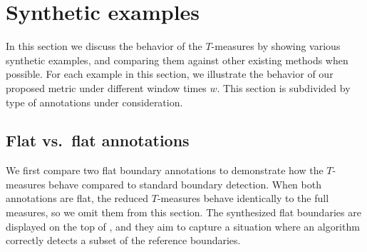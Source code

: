 \documentclass{article}
\begin{document}
\section{Synthetic examples}\label{sec:examples}

In this section we discuss the behavior of the $T$-measures by showing various synthetic examples, and comparing them against other existing methods when possible.
For each example in this section, we illustrate the behavior of our proposed metric under different window times $w$.
This section is subdivided by type of annotations under consideration.

\subsection{Flat vs.\ flat annotations}

We first compare two flat boundary annotations to demonstrate how the $T$-measures behave compared to 
standard boundary detection.
When both annotations are flat, the reduced $T$-measures behave identically to the full measures, so we omit
them from this section.
The synthesized flat boundaries are displayed on the top of , and they aim to capture a
situation where an algorithm correctly detects a subset of the reference boundaries.  
\end{document}
